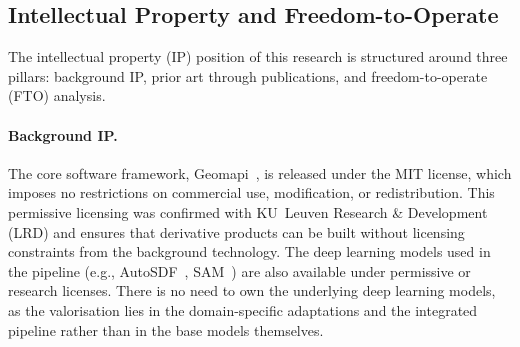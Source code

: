 


\subsection{Intellectual Property and Freedom-to-Operate}
\label{sec:val_ip}

The intellectual property (IP) position of this research is structured around three pillars: background IP, prior art through publications, and freedom-to-operate (FTO) analysis.

\paragraph{Background IP.} The core software framework, Geomapi~\cite{bassier_geomapi_2024}, is released under the MIT license, which imposes no restrictions on commercial use, modification, or redistribution. This permissive licensing was confirmed with KU~Leuven Research \& Development (LRD) and ensures that derivative products can be built without licensing constraints from the background technology. The deep learning models used in the pipeline (e.g., AutoSDF~\cite{mittal_autosdf_2022}, SAM~\cite{kirillov_segment_2023}) are also available under permissive or research licenses. There is no need to own the underlying deep learning models, as the valorisation lies in the domain-specific adaptations and the integrated pipeline rather than in the base models themselves.

